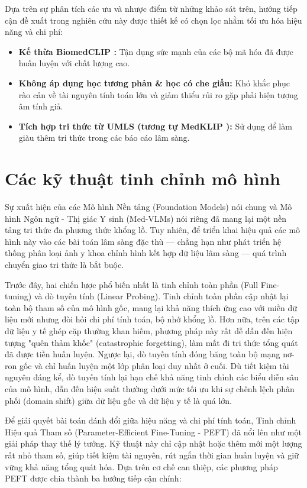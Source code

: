Dựa trên sự phân tích các ưu và nhược điểm từ những khảo sát trên, hướng tiếp cận đề xuất trong nghiên cứu này được thiết kế có chọn lọc nhằm tối ưu hóa hiệu năng và chi phí:
\begin{itemize}
    \item \textbf{Kế thừa BiomedCLIP \cite{BiomedCLIP}:} Tận dụng sức mạnh của các bộ mã hóa đã được huấn luyện với chất lượng cao.
    \item \textbf{Không áp dụng học tương phản \& học có che giấu:} Khó khắc phục rào cản về tài nguyên tính toán lớn và giảm thiểu rủi ro gặp phải hiện tượng âm tính giả.
    \item \textbf{Tích hợp tri thức từ UMLS (tương tự MedKLIP \cite{MedKLIP}):} Sử dụng để làm giàu thêm tri thức trong các báo cáo lâm sàng.
\end{itemize}

\section{Các kỹ thuật tinh chỉnh mô hình}

Sự xuất hiện của các Mô hình Nền tảng (Foundation Models) nói chung và Mô hình Ngôn ngữ - Thị giác Y sinh (Med-VLMs) nói riêng đã mang lại một nền tảng tri thức đa phương thức khổng lồ. Tuy nhiên, để triển khai hiệu quả các mô hình này vào các bài toán lâm sàng đặc thù — chẳng hạn như phát triển hệ thống phân loại ảnh y khoa chỉnh hình kết hợp dữ liệu lâm sàng — quá trình chuyển giao tri thức là bắt buộc. 

Trước đây, hai chiến lược phổ biến nhất là tinh chỉnh toàn phần (Full Fine-tuning) và dò tuyến tính (Linear Probing). Tinh chỉnh toàn phần cập nhật lại toàn bộ tham số của mô hình gốc, mang lại khả năng thích ứng cao với miền dữ liệu mới nhưng đòi hỏi chi phí tính toán, bộ nhớ khổng lồ. Hơn nữa, trên các tập dữ liệu y tế ghép cặp thường khan hiếm, phương pháp này rất dễ dẫn đến hiện tượng "quên thảm khốc" (catastrophic forgetting), làm mất đi tri thức tổng quát đã được tiền huấn luyện. Ngược lại, dò tuyến tính đóng băng toàn bộ mạng nơ-ron gốc và chỉ huấn luyện một lớp phân loại duy nhất ở cuối. Dù tiết kiệm tài nguyên đáng kể, dò tuyến tính lại hạn chế khả năng tinh chỉnh các biểu diễn sâu của mô hình, dẫn đến hiệu suất thường dưới mức tối ưu khi sự chênh lệch phân phối (domain shift) giữa dữ liệu gốc và dữ liệu y tế là quá lớn.

Để giải quyết bài toán đánh đổi giữa hiệu năng và chi phí tính toán, Tinh chỉnh Hiệu quả Tham số (Parameter-Efficient Fine-Tuning - PEFT) đã nổi lên như một giải pháp thay thế lý tưởng. Kỹ thuật này chỉ cập nhật hoặc thêm mới một lượng rất nhỏ tham số, giúp tiết kiệm tài nguyên, rút ngắn thời gian huấn luyện và giữ vững khả năng tổng quát hóa. Dựa trên cơ chế can thiệp, các phương pháp PEFT được chia thành ba hướng tiếp cận chính:

